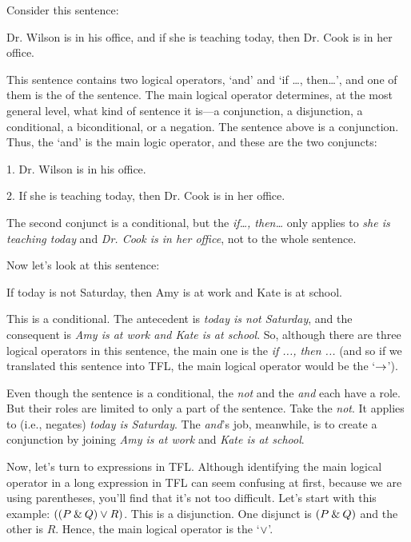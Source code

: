 Consider this sentence: 
\begin{earg}
\item[] {Dr. Wilson is in his  office, and if she is teaching today, then Dr. Cook is in her office}. 
\end{earg}
This sentence contains two logical operators, `and' and `if \ldots, then\ldots', and one of them is the  of the sentence. The main logical operator determines, at the most general level, what kind of sentence it is---a conjunction, a disjunction, a conditional, a biconditional, or a negation. The sentence above is a conjunction. Thus, the `and' is the main logic operator, and these are the two conjuncts: 
\begin{earg}
\item[1.] {Dr. Wilson is in his office}.
\item[2.] {If she is teaching today, then Dr. Cook is in her office}. 
\end{earg}
The second conjunct is a conditional, but the \textit{if\ldots, then\ldots} only applies to \textit{she is teaching today} and \textit{Dr. Cook is in her office}, not to the whole sentence. 

Now let's look at this sentence: 
\begin{ebullet}
	\item[] {If today is not Saturday, then Amy is at work and Kate is at school}. 
\end{ebullet}
	
\noindent This is a conditional. The antecedent is \textit{today is not Saturday}, and the consequent is \textit{Amy is at work and Kate is at school}. So, although there are three logical operators in this sentence, the main one is the \textit{if ..., then ...} (and so if we translated this sentence into TFL, the main logical operator would be the `$\rightarrow$'). 

Even though the sentence is a conditional, the \textit{not} and the \textit{and} each have a role. But their roles are limited to only a part of the sentence. Take the \textit{not}. It applies to (i.e., negates) \textit{today is Saturday}.  
The \textit{and}'s job, meanwhile, is to create a conjunction by joining \textit{Amy is at work} and \textit{Kate is at school}. 

Now, let's turn to expressions in TFL. Although identifying the main logical operator in a long expression in TFL can seem confusing at first, because we are using parentheses, you'll find that it's not too difficult. Let's start with this example: $((P \mathbin{\&} Q) \vee R)$. This is a disjunction. One disjunct is $(P \mathbin{\&} Q)$ and the other is $R$. Hence, the main logical operator is the `$\vee$'. 

